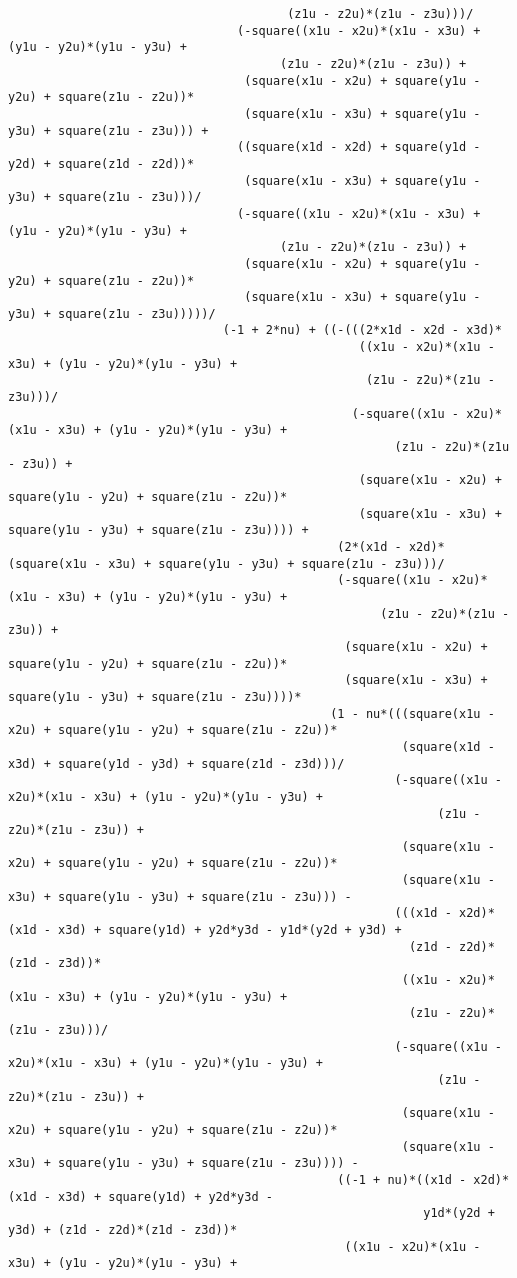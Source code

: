 \begin{lstlisting}
									   (z1u - z2u)*(z1u - z3u)))/
								(-square((x1u - x2u)*(x1u - x3u) + (y1u - y2u)*(y1u - y3u) + 
									  (z1u - z2u)*(z1u - z3u)) + 
								 (square(x1u - x2u) + square(y1u - y2u) + square(z1u - z2u))*
								 (square(x1u - x3u) + square(y1u - y3u) + square(z1u - z3u))) + 
								((square(x1d - x2d) + square(y1d - y2d) + square(z1d - z2d))*
								 (square(x1u - x3u) + square(y1u - y3u) + square(z1u - z3u)))/
								(-square((x1u - x2u)*(x1u - x3u) + (y1u - y2u)*(y1u - y3u) + 
									  (z1u - z2u)*(z1u - z3u)) + 
								 (square(x1u - x2u) + square(y1u - y2u) + square(z1u - z2u))*
								 (square(x1u - x3u) + square(y1u - y3u) + square(z1u - z3u)))))/
							  (-1 + 2*nu) + ((-(((2*x1d - x2d - x3d)*
												 ((x1u - x2u)*(x1u - x3u) + (y1u - y2u)*(y1u - y3u) + 
												  (z1u - z2u)*(z1u - z3u)))/
												(-square((x1u - x2u)*(x1u - x3u) + (y1u - y2u)*(y1u - y3u) + 
													  (z1u - z2u)*(z1u - z3u)) + 
												 (square(x1u - x2u) + square(y1u - y2u) + square(z1u - z2u))*
												 (square(x1u - x3u) + square(y1u - y3u) + square(z1u - z3u)))) + 
											  (2*(x1d - x2d)*(square(x1u - x3u) + square(y1u - y3u) + square(z1u - z3u)))/
											  (-square((x1u - x2u)*(x1u - x3u) + (y1u - y2u)*(y1u - y3u) + 
													(z1u - z2u)*(z1u - z3u)) + 
											   (square(x1u - x2u) + square(y1u - y2u) + square(z1u - z2u))*
											   (square(x1u - x3u) + square(y1u - y3u) + square(z1u - z3u))))*
											 (1 - nu*(((square(x1u - x2u) + square(y1u - y2u) + square(z1u - z2u))*
													   (square(x1d - x3d) + square(y1d - y3d) + square(z1d - z3d)))/
													  (-square((x1u - x2u)*(x1u - x3u) + (y1u - y2u)*(y1u - y3u) + 
															(z1u - z2u)*(z1u - z3u)) + 
													   (square(x1u - x2u) + square(y1u - y2u) + square(z1u - z2u))*
													   (square(x1u - x3u) + square(y1u - y3u) + square(z1u - z3u))) - 
													  (((x1d - x2d)*(x1d - x3d) + square(y1d) + y2d*y3d - y1d*(y2d + y3d) + 
														(z1d - z2d)*(z1d - z3d))*
													   ((x1u - x2u)*(x1u - x3u) + (y1u - y2u)*(y1u - y3u) + 
														(z1u - z2u)*(z1u - z3u)))/
													  (-square((x1u - x2u)*(x1u - x3u) + (y1u - y2u)*(y1u - y3u) + 
															(z1u - z2u)*(z1u - z3u)) + 
													   (square(x1u - x2u) + square(y1u - y2u) + square(z1u - z2u))*
													   (square(x1u - x3u) + square(y1u - y3u) + square(z1u - z3u)))) - 
											  ((-1 + nu)*((x1d - x2d)*(x1d - x3d) + square(y1d) + y2d*y3d - 
														  y1d*(y2d + y3d) + (z1d - z2d)*(z1d - z3d))*
											   ((x1u - x2u)*(x1u - x3u) + (y1u - y2u)*(y1u - y3u) + 

\end{lstlisting}
